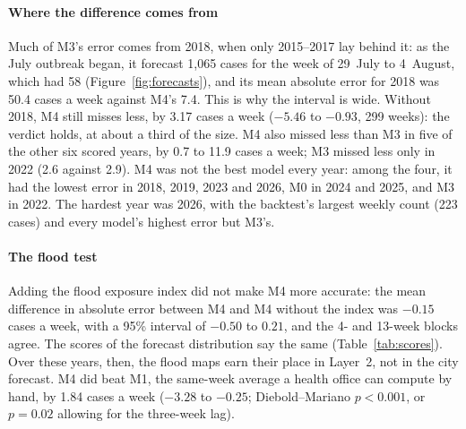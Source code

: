 \paragraph{Where the difference comes from}
Much of M3's error comes from 2018, when only 2015--2017 lay behind it: as the July outbreak
began, it forecast 1,065 cases for the week of 29~July to 4~August, which had 58
(Figure~\ref{fig:forecasts}), and its mean absolute error for 2018 was 50.4 cases a week against
M4's 7.4. This is why the interval is wide. Without 2018, M4 still misses less, by 3.17 cases a
week ($-5.46$ to $-0.93$, 299 weeks): the verdict holds, at about a third of the size. M4 also missed less than M3 in five of the other six
scored years, by 0.7 to 11.9 cases a week; M3 missed less only in 2022 (2.6 against 2.9). M4 was
not the best model every year: among the four, it had the lowest error in 2018, 2019, 2023 and
2026, M0 in 2024 and 2025, and M3 in 2022. The hardest year was 2026, with the backtest's largest
weekly count (223 cases) and every model's highest error but M3's.

\paragraph{The flood test}
Adding the flood exposure index did not make M4 more accurate: the mean difference in absolute
error between M4 and M4 without the index was $-0.15$ cases a week, with a 95\% interval of
$-0.50$ to $0.21$, and the 4- and 13-week blocks agree. The scores of the forecast distribution
say the same (Table~\ref{tab:scores}). Over these years, then, the flood maps earn their place in
Layer~2, not in the city forecast. M4 did beat M1, the same-week average a health office can
compute by hand, by 1.84 cases a week ($-3.28$ to $-0.25$; Diebold--Mariano $p < 0.001$, or
$p = 0.02$ allowing for the three-week lag).

